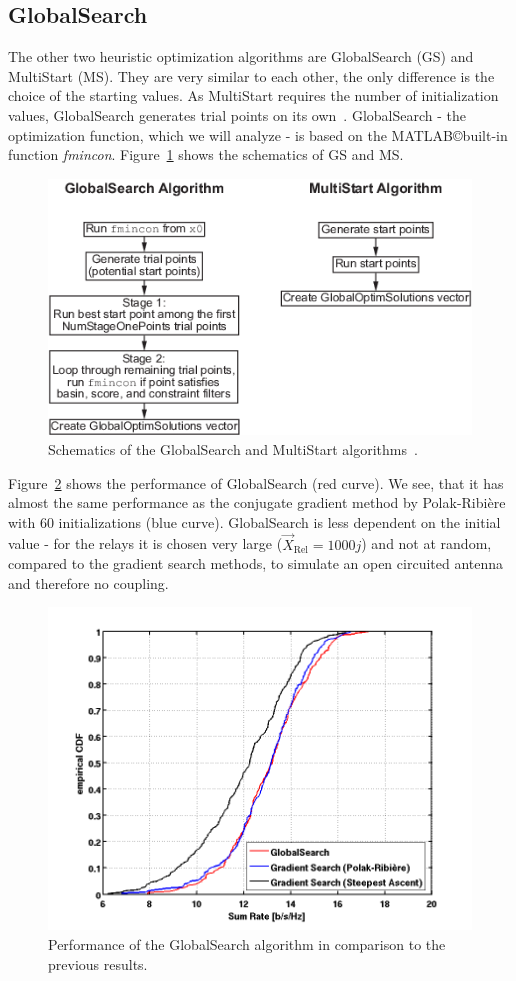 \subsection{GlobalSearch}
\label{sec:globals}
The other two heuristic optimization algorithms are GlobalSearch (GS) and MultiStart (MS).
They are very similar to each other, the only difference is the choice of the starting values.
As MultiStart requires the number of initialization values, GlobalSearch generates trial points on its own~\cite{matlab:gloabls}.
GlobalSearch - the optimization function, which we will analyze - is based on the MATLAB\copyright  built-in function \textit{fmincon}.
Figure~\ref{fig:globals_scheme} shows the schematics of GS and MS.
\begin{figure}[h]
\centering
  \includegraphics[width=0.5\linewidth]{images/global_algorithm.png}
\caption{Schematics of the GlobalSearch and MultiStart algorithms~\cite{matlab:gloabls}.}
\label{fig:globals_scheme}
\end{figure}

Figure~\ref{fig:globals} shows the performance of GlobalSearch (red curve).
We see, that it has almost the same performance as the conjugate gradient method by Polak-Ribi\`{e}re with 60 initializations (blue curve).
GlobalSearch is less dependent on the initial value - for the relays it is chosen very large ($\vec{X}_{\text{Rel}} = 1000j$) and not at random, compared to the gradient search methods, to simulate an open circuited antenna and therefore no coupling.
\begin{figure}[h]
\centering
  \includegraphics[width=0.7\linewidth]{images/Globalscomparison_edited.png}
\caption{Performance of the GlobalSearch algorithm in comparison to the previous results.}
\label{fig:globals}
\end{figure}


